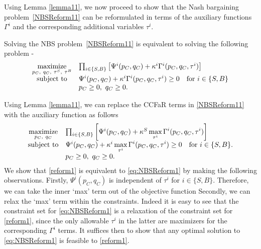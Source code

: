 \noindent Using Lemma \ref{lemma11}, we now proceed to show that the Nash
bargaining problem~\eqref{NBSReform11} can be reformulated in terms of the
auxiliary functions $\Gamma^i$ and the corresponding additional variables
$\tau^i$. 
\begin{proposition}\label{prop1}
	Solving the NBS problem~\eqref{NBSReform11} is equivalent to solving the
	following problem -
	\begin{equation}\label{eq:NBSReform1}
	\begin{array}{cl}
	\displaystyle\mathop{\hbox{\rm maximize}}_{p_C,\ q_C, \ \tau^S,\ \tau^B} & \prod_{i \in \{S,B\}} \left[\Psi^i(p_C, q_C) + \kappa^i \Gamma^i (p_C, q_C, \tau^i)\right] \\
	\mathrm{subject\ to} & \Psi^i(p_C, q_C) + \kappa^i \Gamma^i (p_C, q_C, \tau^i) \geq 0 \quad \text{for} \ i \in \{S,B\} \\
	& p_C \geq 0, \ q_C \geq 0.
	\end{array}
	\end{equation}
\end{proposition}
\noindent Using Lemma \ref{lemma11}, we can replace the CCFaR terms in \eqref{NBSReform11} with the auxiliary function as follows
\begin{equation}\label{reform1}
\begin{array}{cl}
\displaystyle\mathop{\hbox{\rm maximize}}_{p_C, \ q_C} & \prod_{i \in \{S,B\}} \left[\Psi^i(p_C, q_C) + \kappa^S \displaystyle\mathop{\hbox{\rm max}}_{\tau^i} \Gamma^i (p_C, q_C, \tau^i)\right] \\
\mathrm{subject\ to} & \Psi^i(p_C, q_C) + \kappa^i \displaystyle\mathop{\hbox{\rm max}}_{\tau^i} \Gamma^i (p_C, q_C, \tau^i) \geq 0 \quad \text{for} \ i \in \{S,B\}. \\
& p_C \geq 0, \ q_C \geq 0.
\end{array}
\end{equation}
We show that \eqref{reform1} is equivalent to \eqref{eq:NBSReform1} by making
the following observations. Firstly, $\Psi^i(p_C, q_C)$ is independent of
$\tau^i $ for $i \in \{S, B\}$. Therefore, we can take the inner `max' term out
of the objective function Secondly, we can relax the `max' term within the
constraints. Indeed it is easy to see that the constraint set for
\eqref{eq:NBSReform1} is a relaxation of the constraint set for \eqref{reform1},
since the only allowable $\tau^i$ in the
latter are maximizers for the corresponding $\Gamma^i$ terms. It suffices then
to show that any optimal solution to \eqref{eq:NBSReform1} is feasible to
\eqref{reform1}.

